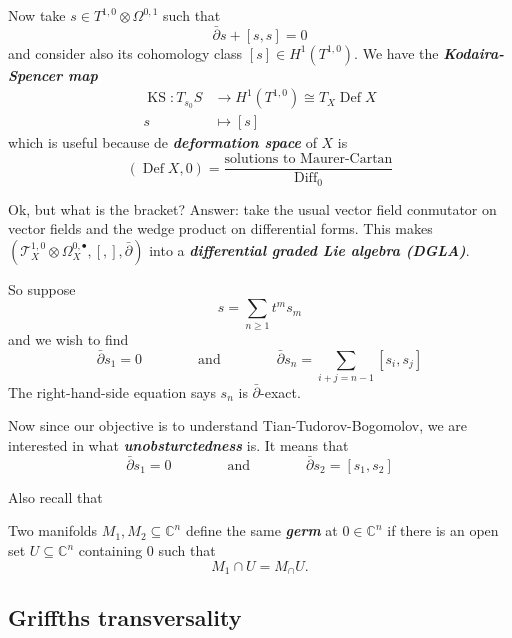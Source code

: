 \documentclass{article}
\numberwithin{equation}{section}
\newcommand{\C}{\mathbb{C}}
\newcommand{\Tc}{\mathcal{T}}
\DeclareMathOperator{\Def}{Def}
\DeclareMathOperator{\Diff}{Diff}
\renewcommand{\Def}{\operatorname{Def}}
\begin{document}
\vspace{2em}
Now take $s\in T^{1,0}\otimes\Omega^{0,1}$ such that
\[\bar\partial s+[s,s]=0\]
and consider also its cohomology class $[s]\in H^1(T^{1,0})$. We have the \textbf{\textit{Kodaira-Spencer map}}
\begin{align*}
	\operatorname{KS}:T_{s_0}S&\to H^1(T^{1,0})\cong T_X\Def X\\
	s&\mapsto [s]
\end{align*}
which is useful because de \textbf{\textit{deformation space}} of $X$ is
\[(\Def X,0)=\frac{\text{solutions to Maurer-Cartan}}{\Diff_0}\]

Ok, but what is the bracket? Answer: take the usual vector field conmutator on vector fields and the wedge product on differential forms. This makes $(\Tc^{1,0}_X\otimes \Omega^{0,\bullet}_X,[,],\bar\partial)$ into a \textbf{\textit{differential graded Lie algebra (DGLA)}}.

So suppose
\[s=\sum_{n\geq1}t^ms_m\]
and we wish to find
\[\bar\partial s_1=0\qquad\qquad\text{and}\qquad\qquad \bar\partial s_n=\sum_{i+j=n-1}[s_i,s_j]\]
The right-hand-side equation says $s_n$ is $\bar\partial$-exact.

Now since our objective is to understand Tian-Tudorov-Bogomolov, we are interested in what \textbf{\textit{unobsturctedness}} is. It means that
\[\bar\partial s_1=0\qquad\qquad\text{and}\qquad\qquad\bar\partial s_2=[s_1,s_2]\]

Also recall that
\begin{defn}
	Two manifolds $M_1,M_2\subseteq\C^n$ define the same \textbf{\textit{germ}} at $0\in\C^n$ if there is an open set $U\subseteq \C^n$ containing $0$ such that
	\[M_1\cap U=M_\cap U.\]
\end{defn}

\subsection{Griffths transversality}

\end{document}
